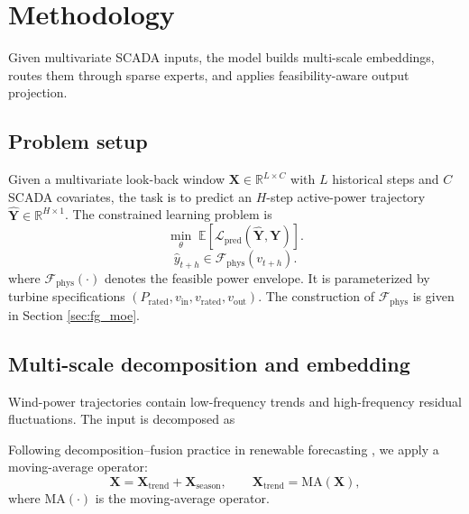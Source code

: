 \documentclass[review,1p,times]{elsarticle}
\begin{document}
\section{Methodology}
\label{sec:method}

Given multivariate SCADA inputs, the model builds multi-scale embeddings, routes them through sparse experts, and applies feasibility-aware output projection.

\subsection{Problem setup}
\label{subsec:problem_formulation}

Given a multivariate look-back window $\mathbf{X}\in\mathbb{R}^{L\times C}$ with $L$ historical steps and $C$ SCADA covariates, the task is to predict an $H$-step active-power trajectory $\hat{\mathbf{Y}}\in\mathbb{R}^{H\times 1}$. The constrained learning problem is
\begin{equation}
\min_{\theta} \; \mathbb{E}\left[\mathcal{L}_{\text{pred}}(\hat{\mathbf{Y}}, \mathbf{Y})\right].
\end{equation}
\begin{equation}
\hat{y}_{t+h} \in \mathcal{F}_{\text{phys}}(v_{t+h}).
\end{equation}
where $\mathcal{F}_{\text{phys}}(\cdot)$ denotes the feasible power envelope. It is parameterized by turbine specifications $(P_{\mathrm{rated}},v_{\mathrm{in}},v_{\mathrm{rated}},v_{\mathrm{out}})$. The construction of $\mathcal{F}_{\text{phys}}$ is given in Section \ref{sec:fg_moe}.

\subsection{Multi-scale decomposition and embedding}
\label{subsec:decomposition}

Wind-power trajectories contain low-frequency trends and high-frequency residual fluctuations. The input is decomposed as

Following decomposition--fusion practice in renewable forecasting \citep{li2023vmdcnn,ma2022gcnwind}, we apply a moving-average operator:
\begin{equation}
\mathbf{X} = \mathbf{X}_{\text{trend}} + \mathbf{X}_{\text{season}}, \qquad 
\mathbf{X}_{\text{trend}} = \text{MA}(\mathbf{X}),
\end{equation}
where $\text{MA}(\cdot)$ is the moving-average operator.
\end{document}
